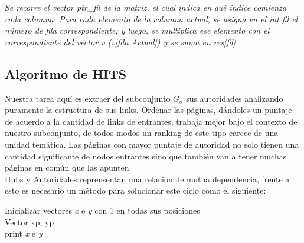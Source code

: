 \documentclass[a4paper]{article}
\begin{document}
\textit{Se recorre el vector ptr_fil de la matriz, el cual indica en qu\'e \'indice comienza cada columna. Para cada elemento de la columna actual, se asigna en el int fil el n\'umero de fila correspondiente; y luego, se multiplica ese elemento con el correspondiente del vector v (v[fila Actual]) y se suma en res[fil].}\\


\newpage
\subsection{Algoritmo de HITS}

\indent Nuestra tarea aquí es extraer del subconjunto $G_\sigma$ sus autoridades analizando puramente la estructura de sus links. Ordenar las páginas, dándoles un puntaje de acuerdo a la cantidad de links de entrantes, trabaja mejor bajo el contexto de nuestro subconjunto, de todos modos un ranking de este tipo carece de una unidad temática. Las páginas con mayor puntaje de autoridad no solo tienen una cantidad significante de nodos entrantes sino que también van a tener muchas páginas en común que las apunten. \\
\indent Hubs y Autoridades reprensentan una relacion de mutua dependencia, frente a esto es necesario un método para solucionar este ciclo como el siguiente:\\

\IncMargin{1em}
\begin{algorithm}

\BlankLine

Inicializar vectores \emph{x} e \emph{y} con 1 en todas sus posiciones\\
Vector xp, yp\\
print \emph{x} e \emph{y}
\end{algorithm}\DecMargin{1em}
\end{document}
